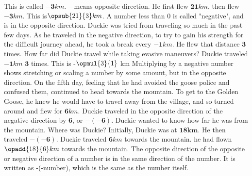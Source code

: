 {This is called $\mathbf{-3} km$. \linebreak – means opposite direction.  He first flew $\mathbf{21} km$, then flew $\mathbf{-3} km$. This is$ \opsub{21}{3} km$.}
{A number less than 0 is called "negative", and is in the opposite direction.}
{}
{Duckie was tried from traveling so much in the past few days. As he traveled in the negative direction, to try to gain his strength for the difficult journey ahead, he took a break every $\mathbf{-1} km$. He flew that distance $\mathbf{3}$ times. How far did Duckie travel while taking evasive maneuvers?}
{Duckie traveled $\mathbf{-1} km$ $\mathbf{3}$ times. This is -$\opmul{3}{1}$ km}
{Multiplying by a negative number shows stretching or scaling a number by some amount, but in the opposite direction.}
{}
{On the fifth day, feeling that he had avoided the goose police and confused them, continued to head towards the mountain. To get to the Golden Goose, he knew he would have to travel away from the village, and so turned around and flew for $\mathbf{6} km$. Duckie traveled in the opposite direction of the negative direction by $\mathbf{6}$, or $\mathbf{-(-6)}$. Duckie wanted to know how far he was from the mountain. Where was Duckie?}
{Initially, Duckie was at $\mathbf{18 km}$. He then traveled $\mathbf{-(-6)}$. Duckie traveled $\mathbf{6} km$ towards the mountain. he had flown $\opadd{18}{6} km$ towards the mountain.}
{The opposite direction of the opposite or negative direction of a number is in the same direction of the number. It is written as -(-number), which is the same as the number itself.}
{}
